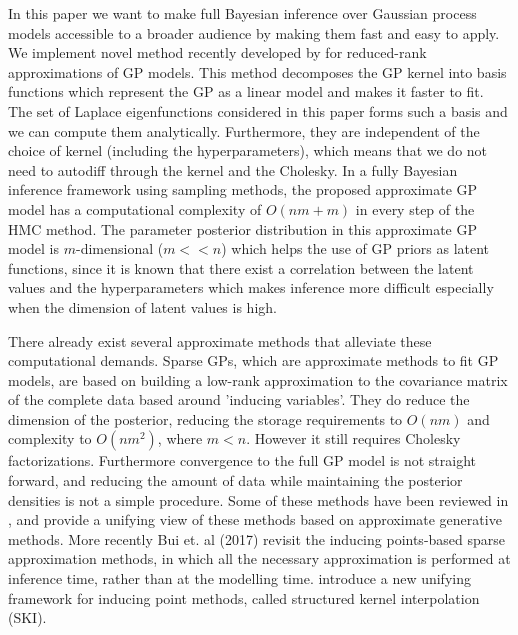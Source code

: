 \documentclass[]{interact}
\theoremstyle{plain}%
\theoremstyle{definition}
\theoremstyle{remark}
\begin{document}
In this paper we want to make full Bayesian inference over Gaussian process models accessible to a broader audience by making them fast and easy to apply. We implement novel method recently  developed by \cite{solin2018hilbert} for reduced-rank approximations of GP models. This method decomposes the GP kernel into basis functions which represent the GP as a linear model and makes it faster to fit. The set of Laplace eigenfunctions considered in this paper forms such a basis and we can compute them analytically. Furthermore, they are independent of the choice of kernel (including the hyperparameters), which means that we do not need to autodiff through the kernel and the Cholesky. In a fully Bayesian inference framework using sampling methods, the proposed approximate GP model has a computational complexity of $O(nm+m)$ in every step of the HMC method. The parameter posterior distribution in this approximate GP model is $m$-dimensional ($m<<n$) which helps the use of GP priors as latent functions, since it is known that there exist a correlation between the latent values and the hyperparameters which makes inference more difficult especially when the dimension of latent values is high.

There already exist several approximate methods that alleviate these computational demands. Sparse GPs, which are approximate methods to fit GP models, are based on building a low-rank approximation to the covariance matrix of the complete data based around 'inducing variables'. They do reduce the dimension of the posterior, reducing the storage requirements to $O(nm)$ and complexity to $O(nm^2)$, where $m < n$. However it still requires Cholesky factorizations. Furthermore convergence to the full GP model is not straight forward, and reducing the amount of data while maintaining the posterior densities is not a simple procedure. Some of these methods have been reviewed in \cite{rasmussen2006gaussian}, and \cite{quinonero2005unifying} provide a unifying view of these methods based on approximate generative methods. More recently Bui et. al (2017) revisit the inducing points-based sparse approximation methods, in which all the necessary approximation is performed at inference time, rather than at the modelling time. \cite{wilson2015kernel} introduce a new unifying framework for inducing point methods, called structured kernel interpolation (SKI).
\end{document}
